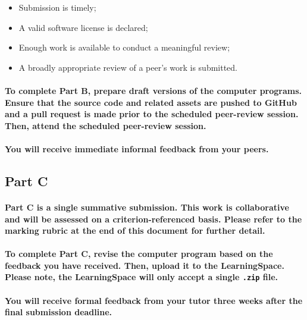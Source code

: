 \documentclass{../../fal_assignment}
\begin{document}
\begin{itemize}
	\item Submission is timely;
	\item A valid software license is declared;
	\item Enough work is available to conduct a meaningful review;
	\item A broadly appropriate review of a peer's work is submitted.
\end{itemize}

\paragraph{To complete Part B, prepare draft versions of the computer programs. Ensure that the source code and related assets are pushed to GitHub and a pull request is made prior to the scheduled peer-review session. Then, attend the scheduled peer-review session.}

\paragraph{You will receive immediate \textbf{informal feedback} from your \textbf{peers}.}

\subsection*{Part C}

\paragraph{Part C is a \textbf{single summative submission}. This work is \textbf{collaborative} and will be assessed on a \textbf{criterion-referenced} basis. Please refer to the marking rubric at the end of this document for further detail.}

\paragraph{To complete Part C, revise the computer program based on the feedback you have received. Then, upload it to the LearningSpace. Please note, the LearningSpace will only accept a single \texttt{.zip} file.}

\paragraph{You will receive \textbf{formal feedback} from your \textbf{tutor} three weeks after the final submission deadline.}
\end{document}
